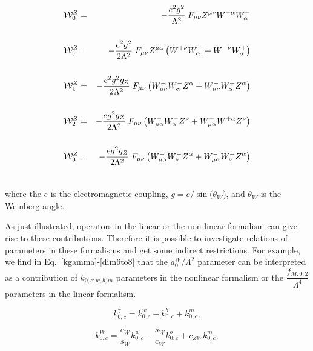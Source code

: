 \begin{eqnarray}
\label{em_oper2}
{\cal W}^{Z}_{0} &=& -\dfrac{e^{2}g^{2}}{\Lambda^{2}}\;F_{\mu\nu}Z^{\mu\nu}W^{+\alpha}W^{-}_{\alpha}  \nonumber\\
&& \nonumber\\
{\cal W}^{Z}_{c} &=& -\dfrac{e^{2}g^{2}}{2\Lambda^{2}}\;F_{\mu\nu}Z^{\mu\alpha} \left( W^{+\nu}W^{-}_{\alpha}+ W^{-\nu}W^{+}_{\alpha} \right) \nonumber\\
&& \nonumber\\
{\cal W}^{Z}_{1} &=& -\dfrac{e^{2}g^{2}g_{Z}}{2\Lambda^{2}}\;F_{\mu\nu} \left( W^{+}_{\mu \nu}W^{-}_{\alpha}Z^{\alpha} + W^{-}_{\mu\nu}W^{+}_{\alpha}Z^{\alpha} \right) \nonumber\\
&& \nonumber\\
{\cal W}^{Z}_{2} &=& -\dfrac{eg^{2}g_{Z}}{2\Lambda^{2}}\;F_{\mu\nu} \left( W^{+}_{\mu \alpha}W^{-}_{\alpha}Z^{\nu} + W^{-}_{\mu\alpha}W^{+\alpha}Z^{\nu} \right) \nonumber \\
&& \nonumber \\
{\cal W}^{Z}_{3} &=& -\dfrac{eg^{2}g_{Z}}{2\Lambda^{2}}\;F_{\mu\nu} \left( W^{+}_{\mu \alpha}W^{-}_{\nu}Z^{\alpha} + W^{-}_{\mu\alpha}W^{+}_{\nu}Z^{\alpha} \right) \\
&& \nonumber
\end{eqnarray}

where the $e$ is the electromagnetic coupling, $g = e/\sin(\theta_W$), and $\theta_W$ is the Weinberg angle.

As just illustrated, operators in the linear or the non-linear
formalism can give rise to these contributions. Therefore it is
possible to investigate relations of parameters in these formalisms
and get some indirect restrictions. For example, we find in
Eq.~\ref{kgamma}-\ref{dim6to8} that the $a_0^W/\Lambda^2$ parameter
can be interpreted as a contribution of $k_{0,c:w,b,m}$ parameters in
the nonlinear formalism or the $\dfrac{f_{M:0,2}}{\Lambda^4}$
parameters in the linear formalism.

\begin{center}
\begin{equation}\label{kgamma}
k_{0,c}^{\gamma} = k_{0,c}^w + k_{0,c}^b + k_{0,c}^m ,
\end{equation}
\end{center}

\begin{center}
\begin{equation}\label{kW}
k_{0,c}^W = \frac{c_W}{s_W} k_{0,c}^w - \frac{s_W}{c_W} k_{0,c}^b + c_{ZW} k_{0,c}^m ,
\end{equation}
\end{center}

